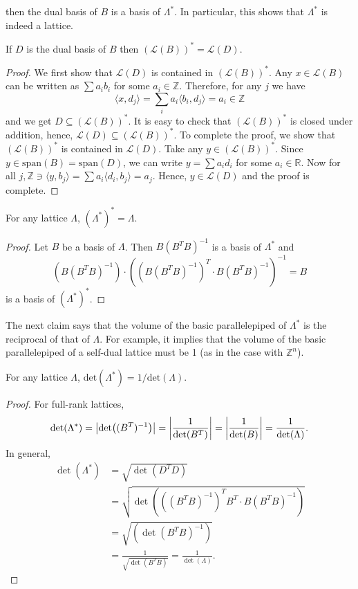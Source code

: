 then the dual basis of $B$ is a basis of $\Lambda^*$. In particular, this shows
that $\Lambda^*$ is indeed a lattice.
\begin{proposition}
  If $D$ is the  dual basis of $B$ then $(\mathcal{L}(B))^* = \mathcal{L}(D)$.
\end{proposition}
\begin{proof}
  We first show that $\mathcal{L}(D)$ is contained in $(\mathcal{L}(B))^*$. Any
  $x\in \mathcal{L}(B)$ can be written as $\sum a_ib_i$ for some
  $a_i\in\mathbb{Z}$. Therefore, for any $j$ we have
  \begin{equation}
    \langle x, d_j\rangle = \sum_i a_i\langle b_i,d_j\rangle = a_i\in\mathbb{Z}
  \end{equation}
  and we get $D\subseteq(\mathcal{L}(B))^*$. It is easy to check that
  $(\mathcal{L}(B))^*$ is closed under addition, hence,
  $\mathcal{L}(D)\subseteq(\mathcal{L}(B))^*$. To complete the proof, we show
  that $(\mathcal{L}(B))^*$ is contained in $\mathcal{L}(D)$. Take any
  $y\in(\mathcal{L}(B))^*$. Since $y\in\mathrm{span}(B) = \mathrm{span}(D)$, we
  can write $y=\sum a_i d_i$ for some $a_i\in\mathbb{R}$. Now for all
  $j,\mathbb{Z}\ni\langle y,b_j\rangle = \sum a_i \langle d_i,b_j\rangle
  = a_j$. Hence, $y\in\mathcal{L}(D)$ and the proof is complete.
\end{proof}
\begin{proposition}
  For any lattice $\Lambda$, $(\Lambda^*)^*=\Lambda$.
\end{proposition}
\begin{proof}
  Let $B$ be a basis of $\Lambda$. Then $B(B^T B)^{-1}$ is a basis of
  $\Lambda^*$ and
  \begin{equation}
    (B(B^T B)^{-1})\cdot((B(B^T B)^{-1})^T\cdot B(B^T B)^{-1})^{-1} = B
  \end{equation}
  is a basis of $(\Lambda^*)^*$.
\end{proof}
\par The next claim says that the volume of the basic parallelepiped of
$\Lambda^*$ is the reciprocal of that of $\Lambda$. For example, it implies
that the volume of the basic parallelepiped of a self-dual lattice must be
1 (as in the case with $\mathbb{Z}^n$).
\begin{proposition}
  For any lattice $\Lambda$, $\mathrm{det}(\Lambda^*)
  = 1/\mathrm{det}(\Lambda)$.
\end{proposition}
\begin{proof}
  For full-rank lattices,
  \begin{equation}
    \det(\Lambda^*) = \abs{\det((B^T)^{-1})} = \abs{\frac{1}{\det(B^T)}}
    = \abs{\frac{1}{\det(B)}}= \frac{1}{\det(\Lambda)}.
  \end{equation}
In general,
\begin{align}
  \det(\Lambda^*) &= \sqrt{\det(D^T D)}\nonumber\\
                  &= \sqrt{\det(((B^T B)^{-1})^TB^T\cdot
B(B^TB)^{-1})}\nonumber\\
                  &=\sqrt{(\det(B^TB)^{-1})}\nonumber\\
                  &=\frac{1}{\sqrt{\det(B^T B)}} = \frac{1}{\det(\Lambda)}.
\end{align}
\end{proof}
